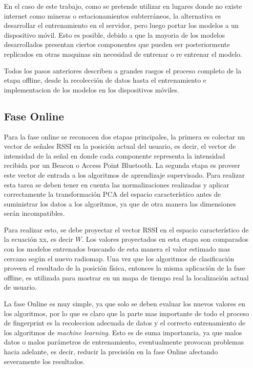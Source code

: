 En el caso de este trabajo, como se pretende utilizar en lugares donde no existe internet como mineras o estacionamientos subterráneos, la alternativa es desarrollar el entrenamiento en el servidor, pero luego portar los modelos a un dispositivo móvil. Esto es posible, debido a que la mayoria de los modelos desarrollados presentan ciertos componentes que pueden ser posteriormente replicados en otras maquinas sin necesidad de entrenar o re entrenar el modelo. 

Todos los pasos anteriores describen a grandes rasgos el proceso completo de la etapa offline, desde la recolección de datos hasta el entrenamiento e implementacion de los modelos en los dispositivos móviles.

\subsection{Fase Online}

Para la fase online se reconocen dos etapas principales, la primera es colectar un vector de señales RSSI en la posición actual del usuario, es decir, el vector de intensidad de la señal en donde cada componente representa la intensidad recibida por un Beacon o Access Point Bluetooth. La segunda etapa es proveer este vector de entrada a los algoritmos de aprendizaje supervisado. Para realizar esta tarea se deben tener en cuenta las normalizaciones realizadas y aplicar correctamente la transformación PCA del espacio característico antes de suministrar los datos a los algoritmos, ya que de otra manera las dimensiones serán incompatibles.

Para realizar esto, se debe proyectar el vector RSSI en el espacio característico de la ecuación xx, es decir $W$. Los valores proyectados en esta etapa son comparados con los modelos entrenados buscando de esta manera el valor estimado mas cercano según el nuevo radiomap. Una vez que los algoritmos de clasificación proveen el resultado de la posición física, entonces la misma aplicación de la fase offline, es utilizada para mostrar en un mapa de tiempo real la localización actual de usuario.

La fase Online es muy simple, ya que solo se deben evaluar los nuevos valores en los algoritmos, por lo que es claro que la parte mas importante de todo el proceso de fingerprint es la recoleccion adecuada de datos y el correcto entrenamiento de los algoritmos de \textit{machine learning}. Esto es de suma importancia, ya que malos datos o malos parámetros de entrenamiento, eventualmente provocan problemas hacia adelante, es decir, reducir la precisión en la fase Online afectando severamente los resultados.

